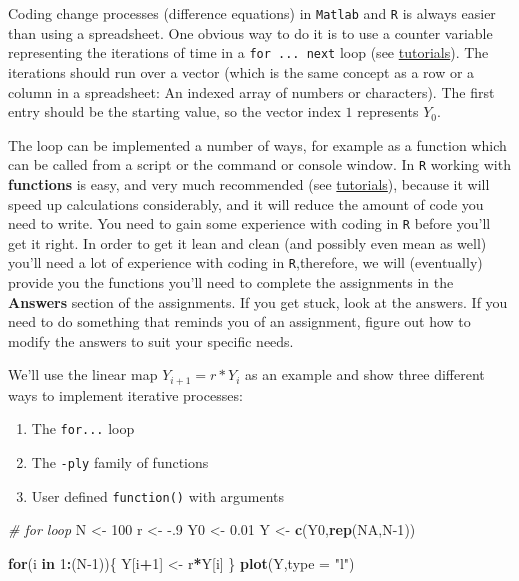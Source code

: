 \documentclass[12pt,]{book}
\newenvironment{Shaded}{\begin{snugshade}}{\end{snugshade}}
\newcommand{\CommentTok}[1]{\textcolor[rgb]{0.56,0.35,0.01}{\textit{#1}}}
\newcommand{\ControlFlowTok}[1]{\textcolor[rgb]{0.13,0.29,0.53}{\textbf{#1}}}
\newcommand{\DataTypeTok}[1]{\textcolor[rgb]{0.13,0.29,0.53}{#1}}
\newcommand{\DecValTok}[1]{\textcolor[rgb]{0.00,0.00,0.81}{#1}}
\newcommand{\FloatTok}[1]{\textcolor[rgb]{0.00,0.00,0.81}{#1}}
\newcommand{\KeywordTok}[1]{\textcolor[rgb]{0.13,0.29,0.53}{\textbf{#1}}}
\newcommand{\NormalTok}[1]{#1}
\newcommand{\OperatorTok}[1]{\textcolor[rgb]{0.81,0.36,0.00}{\textbf{#1}}}
\newcommand{\OtherTok}[1]{\textcolor[rgb]{0.56,0.35,0.01}{#1}}
\newcommand{\StringTok}[1]{\textcolor[rgb]{0.31,0.60,0.02}{#1}}
\providecommand{\tightlist}{%
  \setlength{\itemsep}{0pt}\setlength{\parskip}{0pt}}
\begin{document}
Coding change processes (difference equations) in \texttt{Matlab} and \texttt{R} is always easier than using a spreadsheet. One obvious way to do it is to use a counter variable representing the iterations of time in a \texttt{for\ ...\ next} loop (see \protect\hyperlink{tutorials}{tutorials}). The iterations should run over a vector (which is the same concept as a row or a column in a spreadsheet: An indexed array of numbers or characters). The first entry should be the starting value, so the vector index \(1\) represents \(Y_0\).

The loop can be implemented a number of ways, for example as a function which can be called from a script or the command or console window. In \texttt{R} working with \textbf{functions} is easy, and very much recommended (see \protect\hyperlink{tutorials}{tutorials}), because it will speed up calculations considerably, and it will reduce the amount of code you need to write. You need to gain some experience with coding in \texttt{R} before you'll get it right. In order to get it lean and clean (and possibly even mean as well) you'll need a lot of experience with coding in \texttt{R},therefore, we will (eventually) provide you the functions you'll need to complete the assignments in the \textbf{Answers} section of the assignments. If you get stuck, look at the answers. If you need to do something that reminds you of an assignment, figure out how to modify the answers to suit your specific needs.

We'll use the linear map \(Y_{i+1} = r*Y_i\) as an example and show three different ways to implement iterative processes:

\begin{enumerate}
\def\labelenumi{\arabic{enumi}.}
\tightlist
\item
  The \texttt{for...} loop
\item
  The \texttt{-ply} family of functions
\item
  User defined \texttt{function()} with arguments
\end{enumerate}

\begin{Shaded}
\begin{Highlighting}[]
\CommentTok{# for loop}
\NormalTok{N  <-}\StringTok{ }\DecValTok{100}
\NormalTok{r  <-}\StringTok{ }\FloatTok{-.9}
\NormalTok{Y0 <-}\StringTok{ }\FloatTok{0.01}
\NormalTok{Y  <-}\StringTok{ }\KeywordTok{c}\NormalTok{(Y0,}\KeywordTok{rep}\NormalTok{(}\OtherTok{NA}\NormalTok{,N}\DecValTok{-1}\NormalTok{))}

\ControlFlowTok{for}\NormalTok{(i }\ControlFlowTok{in} \DecValTok{1}\OperatorTok{:}\NormalTok{(N}\DecValTok{-1}\NormalTok{))\{}
\NormalTok{  Y[i}\OperatorTok{+}\DecValTok{1}\NormalTok{] <-}\StringTok{ }\NormalTok{r}\OperatorTok{*}\NormalTok{Y[i]}
\NormalTok{\}}
\KeywordTok{plot}\NormalTok{(Y,}\DataTypeTok{type =} \StringTok{"l"}\NormalTok{)}
\end{Highlighting}
\end{Shaded}
\end{document}
